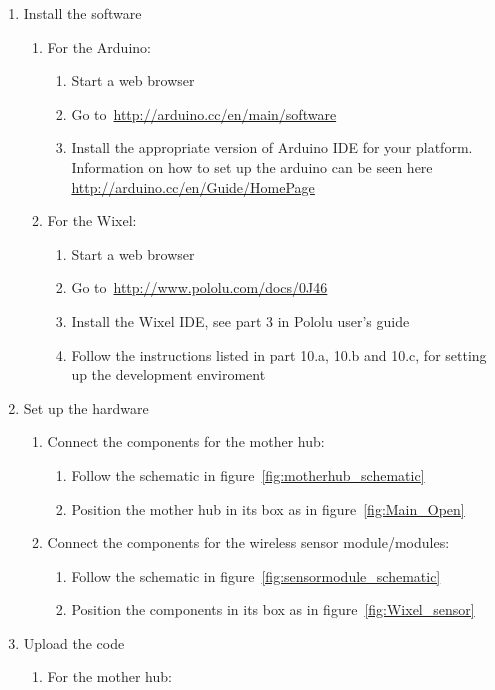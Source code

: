 \begin{enumerate}
\item Install the software
	\begin{enumerate}
	\item For the Arduino:
		\begin{enumerate}
		\item Start a web browser
		\item Go to~\url{http://arduino.cc/en/main/software}
		\item Install the appropriate version of Arduino IDE for your platform. Information on 
		      how to set up the arduino can be seen here \url{http://arduino.cc/en/Guide/HomePage}
		\end{enumerate}
	\item For the Wixel:
		\begin{enumerate}
		\item Start a web browser
		\item Go to~\url{http://www.pololu.com/docs/0J46}
		\item Install the Wixel IDE, see part 3 in Pololu user's guide
		\item Follow the instructions listed in part 10.a, 10.b and 10.c, for setting up the development enviroment
		\end{enumerate}
	\end{enumerate}
\item Set up the hardware
	\begin{enumerate}
	\item Connect the components for the mother hub:
		\begin{enumerate}
		\item Follow the schematic in figure~\ref{fig:motherhub_schematic}
		\item Position the mother hub in its box as in figure~\ref{fig:Main_Open}
		\end{enumerate}
	\item Connect the components for the wireless sensor module/modules:
		\begin{enumerate}
		\item Follow the schematic in figure~\ref{fig:sensormodule_schematic}
		\item Position the components in its box as in figure~\ref{fig:Wixel_sensor}
		\end{enumerate}
	\end{enumerate}
\item Upload the code
	\begin{enumerate}
	\item For the mother hub:

\end{enumerate}
\end{enumerate}
